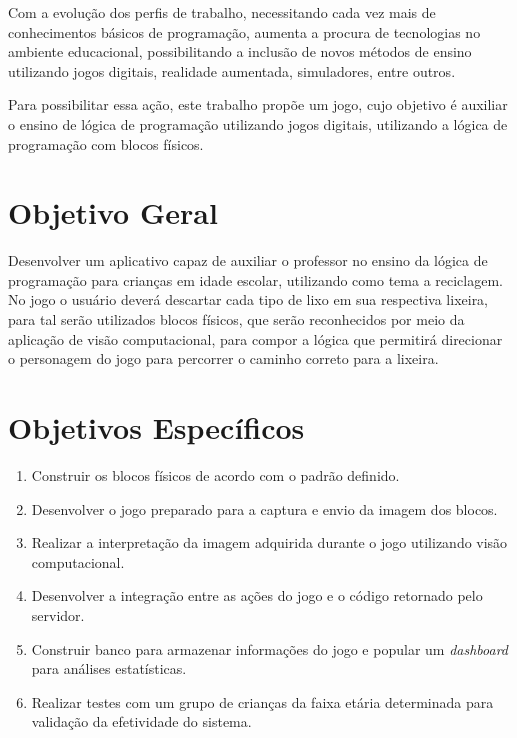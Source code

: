 Com a evolução dos perfis de trabalho, necessitando cada vez mais de conhecimentos básicos de programação, aumenta a procura de tecnologias no ambiente educacional, possibilitando a inclusão de novos métodos de ensino utilizando jogos digitais, realidade aumentada, simuladores, entre outros.

Para possibilitar essa ação, este trabalho propõe um jogo, cujo objetivo é auxiliar o ensino de lógica de programação utilizando jogos digitais, utilizando a lógica de programação com blocos físicos.

\section{Objetivo Geral}

Desenvolver um aplicativo capaz de auxiliar o professor no ensino da lógica de programação para crianças em idade escolar, utilizando como tema a reciclagem. No jogo o usuário deverá descartar cada tipo de lixo em sua respectiva lixeira, para tal serão utilizados blocos físicos, que serão reconhecidos por meio da aplicação de visão computacional, para compor a lógica que permitirá direcionar o personagem do jogo para percorrer o caminho correto para a lixeira.

\section{Objetivos Específicos}

\begin{enumerate}
    \item Construir os blocos físicos de acordo com o padrão definido.
    \item Desenvolver o jogo preparado para a captura e envio da imagem dos blocos.
    \item Realizar a interpretação da imagem adquirida durante o jogo utilizando visão computacional.
    \item Desenvolver a integração entre as ações do jogo e o código retornado pelo servidor.
    \item Construir banco para armazenar informações do jogo e popular um \textit{dashboard} para análises estatísticas.
    \item Realizar testes com um grupo de crianças da faixa etária determinada para validação da efetividade do sistema.
\end{enumerate}
